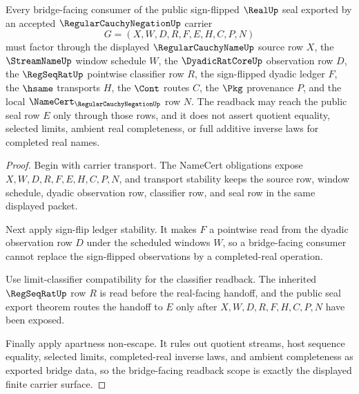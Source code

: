\begin{theorem}
\label{thm:regular-cauchy-negation-bridge-readback-scope}
Every bridge-facing consumer of the public sign-flipped $\RealUp$ seal exported by an accepted $\RegularCauchyNegationUp$ carrier
$$
G=(X,W,D,R,F,E,H,C,P,N)
$$
must factor through the displayed $\RegularCauchyNameUp$ source row $X$, the $\StreamNameUp$ window schedule $W$, the $\DyadicRatCoreUp$ observation row $D$, the $\RegSeqRatUp$ pointwise classifier row $R$, the sign-flipped dyadic ledger $F$, the $\hsame$ transports $H$, the $\Cont$ routes $C$, the $\Pkg$ provenance $P$, and the local $\NameCert_{\RegularCauchyNegationUp}$ row $N$. The readback may reach the public seal row $E$ only through those rows, and it does not assert quotient equality, selected limits, ambient real completeness, or full additive inverse laws for completed real names.
\end{theorem}
\begin{proof}
Begin with carrier transport. The NameCert obligations expose $X,W,D,R,F,E,H,C,P,N$, and transport stability keeps the source row, window schedule, dyadic observation row, classifier row, and seal row in the same displayed packet.

Next apply sign-flip ledger stability. It makes $F$ a pointwise read from the dyadic observation row $D$ under the scheduled windows $W$, so a bridge-facing consumer cannot replace the sign-flipped observations by a completed-real operation.

Use limit-classifier compatibility for the classifier readback. The inherited $\RegSeqRatUp$ row $R$ is read before the real-facing handoff, and the public seal export theorem routes the handoff to $E$ only after $X,W,D,R,F,H,C,P,N$ have been exposed.

Finally apply apartness non-escape. It rules out quotient streams, host sequence equality, selected limits, completed-real inverse laws, and ambient completeness as exported bridge data, so the bridge-facing readback scope is exactly the displayed finite carrier surface.
\end{proof}

